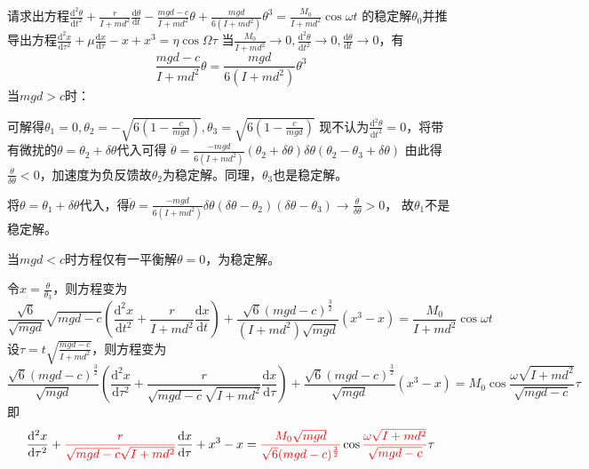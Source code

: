 \documentclass[dvipsnames, svgnames,a4paper,11pt]{article}
\renewcommand{\d}{\mathrm{d}}
\begin{document}
\begin{question}
	请求出方程$\frac{\d ^2\theta}{\d t^2}+\frac{r}{I+md^2}\frac{\d \theta}{\d t}-\frac{mgd-c}{I+md^2}\theta+\frac{mgd}{6(I+md^2)}\theta^3=\frac{M_0}{I+md^2}\cos\omega t$
    的稳定解$\theta_0$并推导出方程$\frac{\d ^2 x}{\d \tau^2}+\mu\frac{\d x}{\d\tau}-x+x^3=\eta\cos\Omega\tau$
	\tcblower
	当$\frac{M_0}{I+md^2}\to 0,\frac{\d^2\theta}{\d t^2}\to 0,\frac{\d \theta}{\d t}\to 0$，有
    \[\frac{mgd-c}{I+md^2}\theta=\frac{mgd}{6(I+md^2)}\theta^3\]
    当$mgd>c$时：

    可解得$\theta_1=0,\theta_2=-\sqrt{6(1-\frac{c}{mgd})},\theta_3=\sqrt{6(1-\frac{c}{mgd})}$
    现不认为$\frac{\d ^2\theta}{\d t^2}=0$，将带有微扰的$\theta=\theta_2+\delta\theta$代入可得
    $\ddot{\theta}=\frac{-mgd}{6(I+md^2)}(\theta_2+\delta\theta)\delta\theta(\theta_2-\theta_3+\delta\theta)$
    由此得$\frac{\ddot{\theta}}{\delta\theta}<0$，加速度为负反馈故$\theta_2$为稳定解。同理，$\theta_3$也是稳定解。
    
    将$\theta=\theta_1+\delta\theta$代入，得$\ddot{\theta}=\frac{-mgd}{6(I+md^2)}\delta\theta(\delta\theta-\theta_2)(\delta\theta-\theta_3)\to \frac{\ddot{\theta}}{\delta\theta}>0$，
    故$\theta_1$不是稳定解。

	当$mgd<c$时方程仅有一平衡解$\theta=0$，为稳定解。
	
	令$x=\frac{\theta}{\theta_3}$，则方程变为
	\[\frac{\sqrt{6}}{\sqrt{mgd}}\sqrt{mgd-c}(\frac{\d^2 x}{\d t^2}+\frac{r}{I+md^2}\frac{\d x}{\d t})+\frac{\sqrt{6}(mgd-c)^{\frac{3}{2}}}{(I+md^2)\sqrt{mgd}}(x^3-x)=\frac{M_0}{I+md^2}\cos\omega t\]
	设$\tau=t\sqrt{\frac{mgd-c}{I+md^2}}$，则方程变为
	\[\frac{\sqrt{6}(mgd-c)^{\frac{3}{2}}}{\sqrt{mgd}}(\frac{\d^2x}{\d \tau^2}+\frac{r}{\sqrt{mgd-c}\sqrt{I+md^2}}\frac{\d x}{\d\tau})+\frac{\sqrt{6}(mgd-c)^{\frac{3}{2}}}{\sqrt{mgd}}(x^3-x)=M_0\cos\frac{\omega\sqrt{I+md^2}}{\sqrt{mgd-c}} \tau\]
	即
	\[\frac{\d^2x}{\d\tau^2}+{\color{red}\frac{r}{\sqrt{mgd-c}\sqrt{I+md^2}}}\frac{\d x}{\d\tau}+x^3-x={\color{red}\frac{M_0\sqrt{mgd}}{\sqrt{6}(mgd-c)^{\frac{3}{2}}}}\cos{\color{red}\frac{\omega\sqrt{I+md^2}}{\sqrt{mgd-c}}} \tau\]
\end{question}
\end{document}
